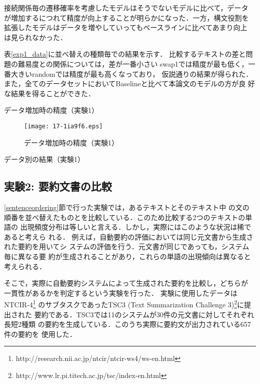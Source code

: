 \documentclass[japanese]{jnlp_1.4}
\begin{document}
  接続関係毎の遷移確率を考慮したモデルはそうでないモデルに比べて，データ
  が増加するにつれて精度が向上することが明らかになった．一方，構文役割を
  拡張したモデルはデータを増やしていってもベースラインに比べてあまり向上
  は見られなかった．

 表\ref{exp1_data}に並べ替えの種類毎での結果を示す．
 比較するテキストの差と問題の難易度との関係については，差が一番小さい
 swap1では精度が最も低く，一番大きいrandomでは精度が最も高くなっており，
 仮説通りの結果が得られた．また，全てのデータセットにおいてBaselineと比べて本論文のモデルの方が良
 好な結果を得ることができた．


\begin{table}[t]
  \caption{データ増加時の精度（実験1）}\label{exp1_add_tab}

\end{table}
  \begin{figure}[t]
   \begin{center}
\texttt{[image: 17-1ia9f6.eps]}
   \end{center}
     \caption{データ増加時の精度（実験1）}
\label{exp1_add}
  \end{figure}
\begin{table}[t]
  \caption{データ別の結果（実験1）}\label{exp1_data}

\end{table}



 \subsection{実験2: 要約文書の比較}

 \ref{sentenceordering}節で行った実験では，あるテキストとそのテキスト中
 の文の順番を並べ替えたものとを比較している．このため比較する2つのテキストの単語の
 出現頻度分布は等しいと言える．しかし，実際にはこのような状況は稀であると考えら
 れる．
 例えば，自動要約の評価においては同じ元文書から生成された要約を用いてシ
 ステムの評価を行う．元文書が同じであっても，システム毎に異なる要
 約が生成されることがあり，これらの単語の出現傾向は異なると考えられる．

 そこで，実際に自動要約システムによって生成された要約を比較し，どちらが
 一貫性があるかを判定するという実験を行った．
 実験に使用したデータは
 NTCIR-4\footnote{http://research.nii.ac.jp/ntcir/ntcir-ws4/ws-en.html}\cite{ntcir4}
 のサブタスクであったTSC3 (Text Summarization Challenge
3)\footnote{http://www.lr.pi.titech.ac.jp/tsc/index-en.html}に提出された
 要約である．TSC3では11のシステムが30件の元文書に対してそれぞれ長短2種類
 の要約を生成している．このうち実際に要約文が出力されている657件の要約を
 使用した．
\end{document}
